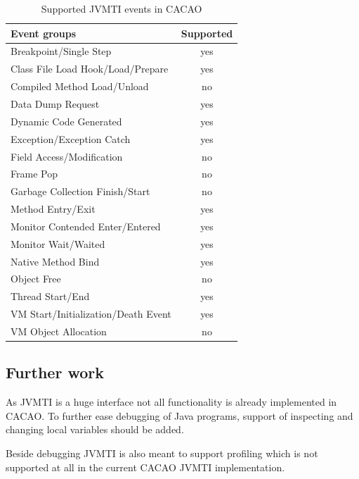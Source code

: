 \begin{table} [h]
\begin{center}
\begin{tabular}{|l|c|}
\hline
Event groups & Supported\\\hline\hline
Breakpoint/Single Step & yes \\ %
Class File Load Hook/Load/Prepare  & yes \\ %
Compiled Method Load/Unload  & no\\
Data Dump Request  & yes \\
Dynamic Code Generated  & yes \\
Exception/Exception Catch  & yes \\
Field Access/Modification  & no \\
Frame Pop  & no \\
Garbage Collection Finish/Start  & no \\
Method Entry/Exit  & yes \\
Monitor Contended Enter/Entered  & yes \\
Monitor Wait/Waited  & yes \\
Native Method Bind  & yes \\
Object Free  & no \\
Thread Start/End  & yes \\
VM Start/Initialization/Death Event  & yes \\
VM Object Allocation  & no \\
\hline
\end{tabular}\end{center}
\caption{Supported JVMTI events in CACAO}
\label{implementedevents}
\end{table} 

\subsection{Further work}
As JVMTI is a huge interface not all functionality is already implemented in CACAO. To further ease debugging of Java programs, support of inspecting and changing local variables should be added. 

Beside debugging JVMTI is also meant to support profiling which is not supported at all in the current CACAO JVMTI implementation.


